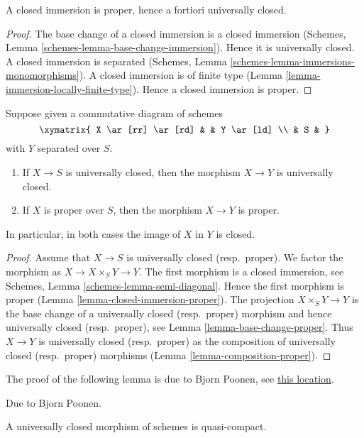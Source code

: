 \begin{lemma}
\label{lemma-closed-immersion-proper}
A closed immersion is proper, hence a fortiori universally closed.
\end{lemma}

\begin{proof}
The base change of a closed immersion is a closed immersion
(Schemes, Lemma \ref{schemes-lemma-base-change-immersion}).
Hence it is universally closed.
A closed immersion is separated
(Schemes, Lemma \ref{schemes-lemma-immersions-monomorphisms}).
A closed immersion is of finite type
(Lemma \ref{lemma-immersion-locally-finite-type}).
Hence a closed immersion is proper.
\end{proof}

\begin{lemma}
\label{lemma-image-proper-scheme-closed}
Suppose given a commutative diagram of schemes
$$
\xymatrix{
X \ar[rr] \ar[rd] & &
Y \ar[ld] \\
& S &
}
$$
with $Y$ separated over $S$.
\begin{enumerate}
\item If $X \to S$ is universally closed, then the morphism
$X \to Y$ is universally closed.
\item If $X$ is proper over $S$, then the morphism $X \to Y$ is proper.
\end{enumerate}
In particular, in both cases the image of $X$ in $Y$ is closed.
\end{lemma}

\begin{proof}
Assume that $X \to S$ is universally closed (resp.\ proper).
We factor the morphism as $X \to X \times_S Y \to Y$.
The first morphism is a closed immersion, see
Schemes, Lemma \ref{schemes-lemma-semi-diagonal}.
Hence the first morphism is proper (Lemma \ref{lemma-closed-immersion-proper}).
The projection $X \times_S Y \to Y$ is the base change
of a universally closed (resp.\ proper) morphism and hence
universally closed (resp.\ proper), see Lemma \ref{lemma-base-change-proper}.
Thus $X \to Y$ is universally closed (resp.\ proper) as the composition
of universally closed (resp.\ proper) morphisms
(Lemma \ref{lemma-composition-proper}).
\end{proof}

\noindent
The proof of the following lemma is due to Bjorn Poonen, see
\href{https://mathoverflow.net/questions/23337/is-a-universally-closed-morphism-of-schemes-quasi-compact/23528#23528}{this location}.

\begin{lemma}
\label{lemma-universally-closed-quasi-compact}
\begin{reference}
Due to Bjorn Poonen.
\end{reference}
A universally closed morphism of schemes is quasi-compact.
\end{lemma}

